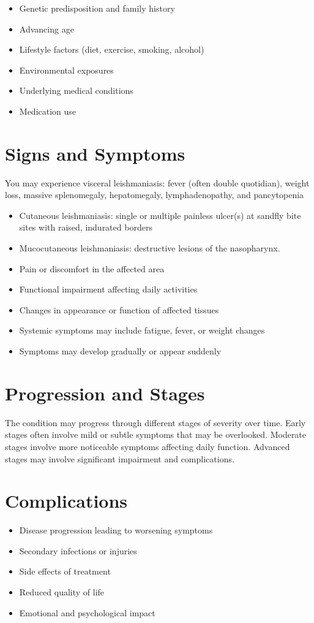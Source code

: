 \begin{itemize}[noitemsep]
  \item Genetic predisposition and family history
  \item Advancing age
  \item Lifestyle factors (diet, exercise, smoking, alcohol)
  \item Environmental exposures
  \item Underlying medical conditions
  \item Medication use
\end{itemize}
\section{Signs and Symptoms}
You may experience visceral leishmaniasis: fever (often double quotidian), weight loss, massive splenomegaly, hepatomegaly, lymphadenopathy, and pancytopenia

\begin{itemize}[noitemsep]
  \item Cutaneous leishmaniasis: single or multiple painless ulcer(s) at sandfly bite sites with raised, indurated borders
  \item Mucocutaneous leishmaniasis: destructive lesions of the nasopharynx.
  \item Pain or discomfort in the affected area
  \item Functional impairment affecting daily activities
  \item Changes in appearance or function of affected tissues
  \item Systemic symptoms may include fatigue, fever, or weight changes
  \item Symptoms may develop gradually or appear suddenly
\end{itemize}
\section{Progression and Stages}
The condition may progress through different stages of severity over time. Early stages often involve mild or subtle symptoms that may be overlooked. Moderate stages involve more noticeable symptoms affecting daily function. Advanced stages may involve significant impairment and complications.
\section{Complications}
\begin{itemize}[noitemsep]
  \item Disease progression leading to worsening symptoms
  \item Secondary infections or injuries
  \item Side effects of treatment
  \item Reduced quality of life
  \item Emotional and psychological impact
\end{itemize}
